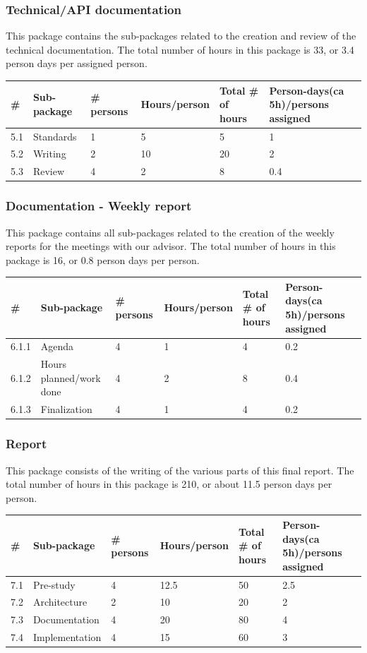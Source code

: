 \subsubsection{Technical/API documentation}
This package contains the sub-packages related to the creation and review of the technical documentation. The total number of hours in this package is 33, or 3.4 person days per assigned person.
\begin{longtable}{|p{0.7cm}|p{3cm}|p{1.8cm}|p{2.5cm}|p{2cm}|p{2.8cm}|}
\hline
\# & Sub-package & \# persons & Hours/person & Total \# of hours & Person-days(ca 5h)/persons assigned\\ 
\hline
5.1 & Standards & 1 & 5 & 5 & 1\\ 
\hline
5.2 & Writing & 2 & 10 & 20 & 2\\ 
\hline
5.3 & Review & 4 & 2 & 8 & 0.4\\ 
\hline
\end{longtable}

\subsubsection{Documentation - Weekly report}
This package contains all sub-packages related to the creation of the weekly reports for the meetings with our advisor. The total number of hours in this package is 16, or 0.8 person days per person.
\begin{longtable}{|p{0.7cm}|p{3cm}|p{1.8cm}|p{2.5cm}|p{2cm}|p{2.8cm}|}
\hline
\# & Sub-package & \# persons & Hours/person & Total \# of hours & Person-days(ca 5h)/persons assigned\\ 
\hline
6.1.1 & Agenda & 4 & 1 & 4 & 0.2\\ 
\hline
6.1.2 & Hours planned/work done & 4 & 2 & 8 & 0.4\\ 
\hline
6.1.3 & Finalization & 4 & 1 & 4 & 0.2\\ 
\hline
\end{longtable}

\subsubsection{Report}
This package consists of the writing of the various parts of this final report. The total number of hours in this package is 210, or about 11.5 person days per person.
\begin{longtable}{|p{0.7cm}|p{3cm}|p{1.8cm}|p{2.5cm}|p{2cm}|p{2.8cm}|}
\hline
\# & Sub-package & \# persons & Hours/person & Total \# of hours & Person-days(ca 5h)/persons assigned\\ 
\hline
7.1 & Pre-study & 4 & 12.5 & 50 & 2.5\\ 
\hline
7.2 & Architecture & 2 & 10 & 20 & 2\\ 
\hline
7.3 & Documentation & 4 & 20 & 80 & 4\\ 
\hline
7.4 & Implementation & 4 & 15 & 60 & 3\\ 
\hline
\end{longtable}


